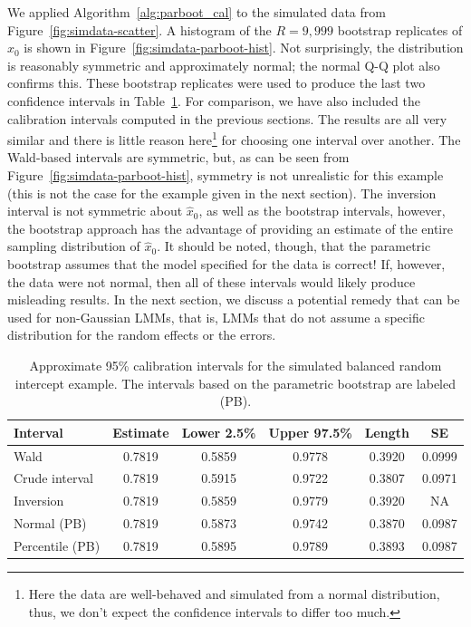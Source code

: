 \documentclass[cmfont,usenames,dvipsnames,leqno]{afit-etd}\usepackage[]{graphicx}\usepackage[]{color}
\newcommand{\wh}[1]{\ensuremath{\widehat{#1}}}
\begin{document}
We applied Algorithm~\ref{alg:parboot_cal} to the simulated data from Figure~\ref{fig:simdata-scatter}. A histogram of the $R = 9,999$ bootstrap replicates of $\wh{x}_0$ is shown in Figure~\ref{fig:simdata-parboot-hist}. Not surprisingly, the distribution is reasonably symmetric and approximately normal; the normal Q-Q plot also confirms this. These bootstrap replicates were used to produce the last two confidence intervals in Table~\ref{tab:simdata-intervals}. For comparison, we have also included the calibration intervals computed in the previous sections. The results are all very similar and there is little reason here\footnote{Here the data are well-behaved and simulated from a normal distribution, thus, we don't expect the confidence intervals to differ too much.} for choosing one interval over another. The Wald-based intervals are symmetric, but, as can be seen from Figure~\ref{fig:simdata-parboot-hist}, symmetry is not unrealistic for this example (this is not the case for the example given in the next section). The inversion interval is not symmetric about $\wh{x}_0$, as well as the bootstrap intervals, however, the bootstrap approach has the advantage of providing an estimate of the entire sampling distribution of $\wh{x}_0$. It should be noted, though, that the parametric bootstrap assumes that the model specified for the data is correct! If, however, the data were not normal, then all of these intervals would likely produce misleading results. In the next section, we discuss a potential remedy that can be used for non-Gaussian LMMs, that is, LMMs that do not assume a specific distribution for the random effects or the errors.
\begin{table}[H]
\label{tab:simdata-intervals}
  \begin{tabular}{lccccc}
    \toprule
    Interval        & Estimate & Lower 2.5\% & Upper 97.5\% & Length & SE \\
    \midrule
    Wald            & 0.7819 & 0.5859 & 0.9778 & 0.3920 & 0.0999 \\
    Crude interval  & 0.7819 & 0.5915 & 0.9722 & 0.3807 & 0.0971 \\
    Inversion       & 0.7819 & 0.5859 & 0.9779 & 0.3920 & NA     \\
    Normal (PB)     & 0.7819 & 0.5873 & 0.9742 & 0.3870 & 0.0987 \\
    Percentile (PB) & 0.7819 & 0.5895 & 0.9789 & 0.3893 & 0.0987 \\
    \bottomrule
  \end{tabular}
\caption[ 95\% calibration intervals for simulated balanced random intercept data]{Approximate 95\% calibration intervals for the simulated balanced random intercept example. The intervals based on the parametric bootstrap are labeled (PB).}
\end{table}
\end{document}
